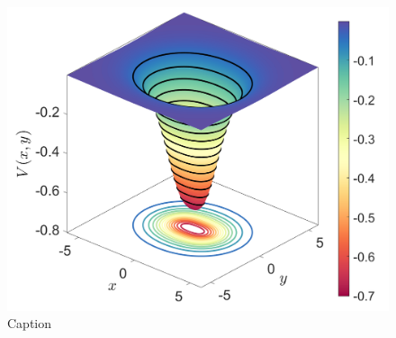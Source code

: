 \documentclass[10pt,aps,onecolumn,superscriptaddress]{revtex4-2}
\begin{document}
\begin{figure}
    \centering
    \includegraphics[scale=0.3]{untitled.png}
    \caption{Caption}
    \label{fig:my_label}
\end{figure}


\newpage


\end{document}
